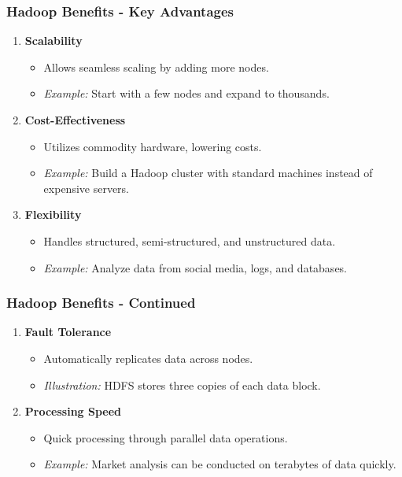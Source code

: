 \documentclass[aspectratio=169]{beamer}
\begin{document}
\begin{frame}[fragile]
    \frametitle{Hadoop Benefits - Key Advantages}
    \begin{enumerate}
        \item \textbf{Scalability}
            \begin{itemize}
                \item Allows seamless scaling by adding more nodes.
                \item \textit{Example:} Start with a few nodes and expand to thousands.
            \end{itemize}
        
        \item \textbf{Cost-Effectiveness}
            \begin{itemize}
                \item Utilizes commodity hardware, lowering costs.
                \item \textit{Example:} Build a Hadoop cluster with standard machines instead of expensive servers.
            \end{itemize}
        
        \item \textbf{Flexibility}
            \begin{itemize}
                \item Handles structured, semi-structured, and unstructured data.
                \item \textit{Example:} Analyze data from social media, logs, and databases.
            \end{itemize}
    \end{enumerate}
\end{frame}

\begin{frame}[fragile]
    \frametitle{Hadoop Benefits - Continued}
    \begin{enumerate}[resume]
        \item \textbf{Fault Tolerance}
            \begin{itemize}
                \item Automatically replicates data across nodes.
                \item \textit{Illustration:} HDFS stores three copies of each data block.
            \end{itemize}

        \item \textbf{Processing Speed}
            \begin{itemize}
                \item Quick processing through parallel data operations.
                \item \textit{Example:} Market analysis can be conducted on terabytes of data quickly.
            \end{itemize}
    \end{enumerate}
\end{frame}
\end{document}
